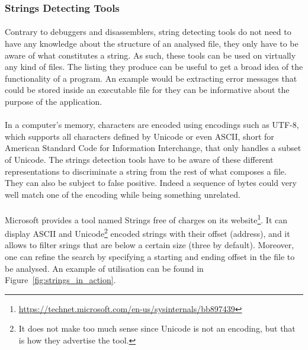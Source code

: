 \subsubsection{Strings Detecting Tools}
\paragraph{}
Contrary to debuggers and disassemblers, string detecting tools do not need to have any knowledge about the structure of an analysed file, they only have to be aware of what constitutes a string. As such, these tools can be used on virtually any kind of files. The listing they produce can be useful to get a broad idea of the functionality of a program. An example would be extracting error messages that could be stored inside an executable file for they can be informative about the purpose of the application.

\paragraph{}
In a computer's memory, characters are encoded using encodings such as UTF-8, which supports all characters defined by Unicode or even ASCII, short for American Standard Code for Information Interchange, that only handles a subset of Unicode. The strings detection tools have to be aware of these different representations to discriminate a string from the rest of what composes a file. They can also be subject to false positive. Indeed a sequence of bytes could very well match one of the encoding while being something unrelated. 

\paragraph{}
Microsoft provides a tool named Strings free of charges on its website\footnote{\url{https://technet.microsoft.com/en-us/sysinternals/bb897439}}. It can display ASCII and Unicode\footnote{It does not make too much sense since Unicode is not an encoding, but that is how they advertise the tool.} encoded strings with their offset (address), and it allows to filter srings that are below a certain size (three by default). Moreover, one can refine the search by specifying a starting and ending offset in the file to be analysed. An example of utilisation can be found in Figure~\ref{fig:strings_in_action}. 

